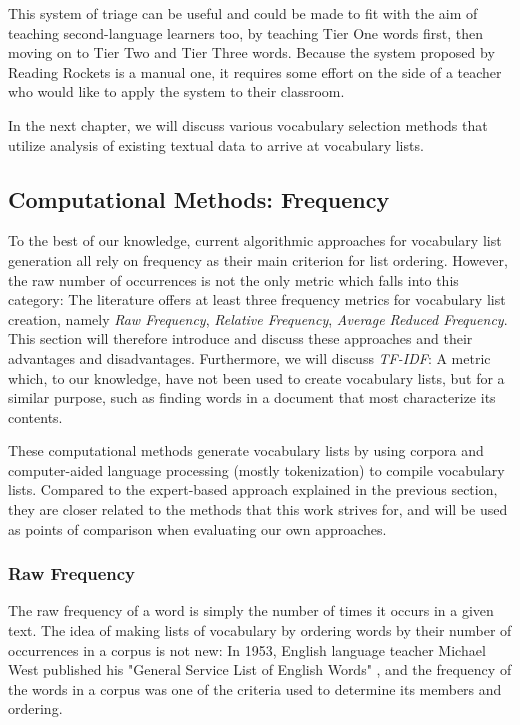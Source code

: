 This system of triage can be useful and could be made to fit with the aim of teaching second-language learners too, by teaching Tier One words first, then moving on to Tier Two and Tier Three words.
Because the system proposed by Reading Rockets is a manual one, it requires some effort on the side of a teacher who would like to apply the system to their classroom.

In the next chapter, we will discuss various vocabulary selection methods that utilize analysis of existing textual data to arrive at vocabulary lists.

\subsection{Computational Methods: Frequency}
To the best of our knowledge, current algorithmic approaches for vocabulary list generation all rely on frequency as their main criterion for list ordering.
However, the raw number of occurrences is not the only metric which falls into this category:
The literature offers at least three frequency metrics for vocabulary list creation, namely \textit{Raw Frequency}, \textit{Relative Frequency}, \textit{Average Reduced Frequency}.
This section will therefore introduce and discuss these approaches and their advantages and disadvantages.
Furthermore, we will discuss \textit{TF-IDF}:
A metric which, to our knowledge, have not been used to create vocabulary lists, but for a similar purpose, such as finding words in a document that most characterize its contents.

These computational methods generate vocabulary lists by using corpora and computer-aided language processing (mostly tokenization) to compile vocabulary lists.
Compared to the expert-based approach explained in the previous section, they are closer related to the methods that this work strives for, and will be used as points of comparison when evaluating our own approaches.

\subsubsection {Raw Frequency}
The raw frequency of a word is simply the number of times it occurs in a given text.
The idea of making lists of vocabulary by ordering words by their number of occurrences in a corpus is not new:
In 1953, English language teacher Michael West published his "General Service List of English Words" \cite{michaelwestGeneralServiceList1953}, and the frequency of the words in a corpus was one of the criteria used to determine its members and ordering.


